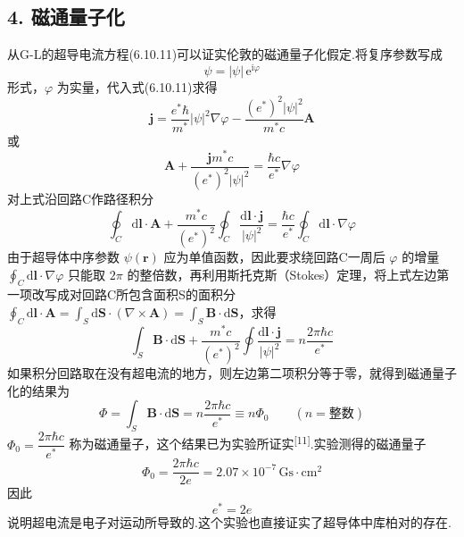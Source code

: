 \subsection*{4. 磁通量子化}

从G-L的超导电流方程(6.10.11)可以证实伦敦的磁通量子化假定.将复序参数写成
\begin{equation*}
  \psi=|\psi|\,\mathrm{e}^{\mathrm{i}\varphi}
\end{equation*}
形式，$\varphi$ 为实量，代入式(6.10.11)求得
\begin{equation}
  \boldsymbol{j}=\frac{e^{*}\hbar}{m^{*}}|\psi|^{2}\nabla\varphi
  -\frac{\left(e^{*}\right)^{2}|\psi|^{2}}{m^{*}c}\boldsymbol{A}
\end{equation}
或
\begin{equation}
  \boldsymbol{A}+\frac{\boldsymbol{j}m^{*}c}{\left(e^{*}\right)^{2}|\psi|^{2}}
  =\frac{\hbar c}{e^{*}}\nabla\varphi
\end{equation}
对上式沿回路C作路径积分
\begin{equation}
  \oint_{C}\mathrm{d}\boldsymbol{l}\cdot\boldsymbol{A}
  +\frac{m^{*}c}{\left(e^{*}\right)^{2}}\oint_{C}
  \frac{\mathrm{d}\boldsymbol{l}\cdot\boldsymbol{j}}{|\psi|^{2}}
  =\frac{\hbar c}{e^{*}}\oint_{C}\mathrm{d}\boldsymbol{l}\cdot\nabla\varphi
\end{equation}
由于超导体中序参数 $\psi(\boldsymbol{r})$ 应为单值函数，因此要求绕回路C一周后 $\varphi$ 的增量
$\oint_{C}\mathrm{d}\boldsymbol{l}\cdot\nabla\varphi$ 只能取 $2\pi$ 的整倍数，再利用斯托克斯（Stokes）定理，将上式左边第一项改写成对回路C所包含面积S的面积分
$\oint_{C}\mathrm{d}\boldsymbol{l}\cdot\boldsymbol{A}
=\int_{S}\mathrm{d}\boldsymbol{S}\cdot\left(\nabla\times\boldsymbol{A}\right)
=\int_{S}\boldsymbol{B}\cdot\mathrm{d}\boldsymbol{S}$，求得
\begin{equation}
  \int_{S}\boldsymbol{B}\cdot\mathrm{d}\boldsymbol{S}
  +\frac{m^{*}c}{\left(e^{*}\right)^{2}}\oint
  \frac{\mathrm{d}\boldsymbol{l}\cdot\boldsymbol{j}}{|\psi|^{2}}
  =n\frac{2\pi\hbar c}{e^{*}}
\end{equation}
如果积分回路取在没有超电流的地方，则左边第二项积分等于零，就得到磁通量子化的结果为
\begin{equation}
  \Phi=\int_{S}\boldsymbol{B}\cdot\mathrm{d}\boldsymbol{S}
  =n\frac{2\pi\hbar c}{e^{*}}\equiv n\Phi_{0}
  \qquad(n=\text{整数})
\end{equation}
$\Phi_{0}=\dfrac{2\pi\hbar c}{e^{*}}$ 称为磁通量子，这个结果已为实验所证实\textsuperscript{[11]}.实验测得的磁通量子
\begin{equation}
  \Phi_{0}=\frac{2\pi\hbar c}{2e}=2.07\times10^{-7}\,\mathrm{Gs\cdot cm^{2}}
\end{equation}
因此
\begin{equation}
  e^{*}=2e
\end{equation}
说明超电流是电子对运动所导致的.这个实验也直接证实了超导体中库柏对的存在.

